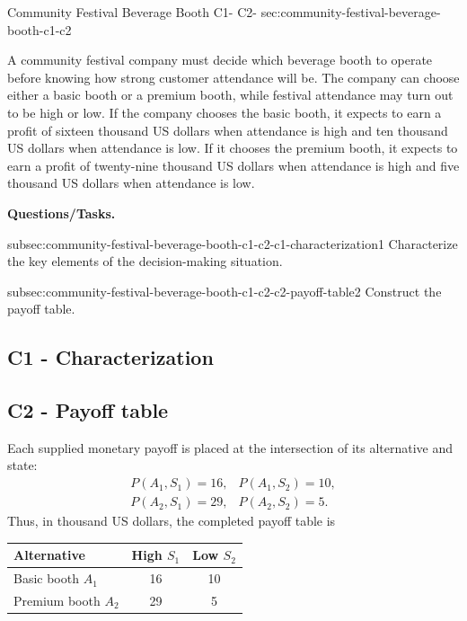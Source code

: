 	\sectionScored
	{Community Festival Beverage Booth}
	{C1- \hspace{2mm} C2-}
	{sec:community-festival-beverage-booth-c1-c2}
	{
		A community festival company must decide which beverage booth to operate before knowing how strong customer attendance will be. The company can choose either a basic booth or a premium booth, while festival attendance may turn out to be high or low. If the company chooses the basic booth, it expects to earn a profit of sixteen thousand US dollars when attendance is high and ten thousand US dollars when attendance is low. If it chooses the premium booth, it expects to earn a profit of twenty-nine thousand US dollars when attendance is high and five thousand US dollars when attendance is low.
		
		\textbf{Questions/Tasks.}
		\begin{enumerate}
			\CriterionTask
			{subsec:community-festival-beverage-booth-c1-c2-c1-characterization}{1}
			{Characterize the key elements of the decision-making situation. }
			
			\CriterionTask
			{subsec:community-festival-beverage-booth-c1-c2-c2-payoff-table}{2}
			{Construct the payoff table. }
		\end{enumerate}
		
		\label{subsec:community-festival-beverage-booth-c1-c2-c1-characterization}
		\subsection*{C1 - Characterization }
		
		
		\label{subsec:community-festival-beverage-booth-c1-c2-c2-payoff-table}
		\subsection*{C2 - Payoff table }
		
		Each supplied monetary payoff is placed at the intersection of its alternative and state:
		\[
		\begin{array}{ll}
			P(A_1,S_1)=16, & P(A_1,S_2)=10,\\
			P(A_2,S_1)=29, & P(A_2,S_2)=5.
		\end{array}
		\]
		Thus, in thousand US dollars, the completed payoff table is
		\begin{center}
			\begin{tabular}{lcc}
				\toprule
				Alternative & High \(S_1\) & Low \(S_2\)\\
				\midrule
				Basic booth \(A_1\) & 16 & 10\\
				Premium booth \(A_2\) & 29 & 5\\
				\bottomrule
			\end{tabular}
		\end{center}
		
}
